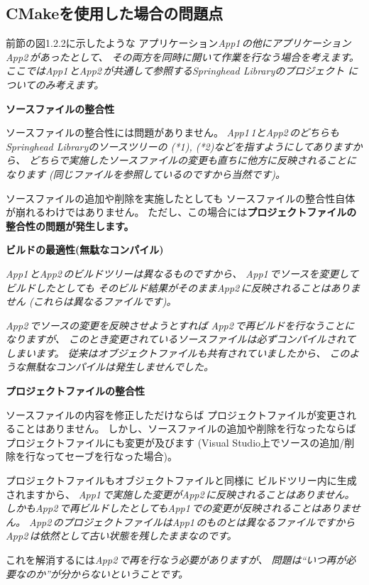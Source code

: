 \subsection{CMakeを使用した場合の問題点}
\label{subsec:Problems}

\def\App#1{\it{App#1\,}}
\def\App#1{\it{App#1\,}}

\noindent
前節の図1.2.2に示したような
アプリケーション\App{1}の他にアプリケーション\App{2}があったとして、
その両方を同時に開いて作業を行なう場合を考えます。
ここでは\App{1}と\App{2}が共通して参照するSpringhead Libraryのプロジェクト
についてのみ考えます。

\bigskip
\noindent
\bf{ソースファイルの整合性}
\begin{narrow}[20pt]
	ソースファイルの整合性には問題がありません。
	\App1{1}と\App{2}のどちらもSpringhead Libraryのソースツリーの
	(*1), (*2)などを指すようにしてありますから、
	どちらで実施したソースファイルの変更も直ちに他方に反映されることになります
	(同じファイルを参照しているのですから当然です)。

	ソースファイルの追加や削除を実施したとしても
	ソースファイルの整合性自体が崩れるわけではありません。
	ただし、この場合には\bf{プロジェクトファイルの整合性}の問題が発生します。
\end{narrow}

\medskip
\noindent
\bf{ビルドの最適性(無駄なコンパイル)}
\begin{narrow}[20pt]
	\App{1}と\App{2}のビルドツリーは異なるものですから、
	\App{1}でソースを変更してビルドしたとしても
	そのビルド結果がそのまま\App{2}に反映されることはありません
	(これらは異なるファイルです)。

	\App{2}でソースの変更を反映させようとすれば
	\App{2}で再ビルドを行なうことになりますが、
	このとき変更されているソースファイルは必ずコンパイルされてしまいます。
	従来はオブジェクトファイルも共有されていましたから、
	このような無駄なコンパイルは発生しませんでした。
\end{narrow}

\medskip
\noindent
\bf{プロジェクトファイルの整合性}
\begin{narrow}[20pt]
	ソースファイルの内容を修正しただけならば
	プロジェクトファイルが変更されることはありません。
	しかし、ソースファイルの追加や削除を行なったならば
	プロジェクトファイルにも変更が及びます
	(Visual Studio上でソースの追加/削除を行なってセーブを行なった場合)。

	プロジェクトファイルもオブジェクトファイルと同様に
	ビルドツリー内に生成されますから、
	\App{1}で実施した変更が\App{2}に反映されることはありません。
	しかも\App{2}で再ビルドしたとしても\App{1}での変更が反映されることはありません。
	\App{2}のプロジェクトファイルは\App{1}のものとは異なるファイルですから
	\App{2}は依然として古い状態を残したままなのです。

	これを解消するには\App{2}で再\cmake を行なう必要がありますが、
	問題は``いつ再\cmake が必要なのか''が分からないということです。
\end{narrow}

